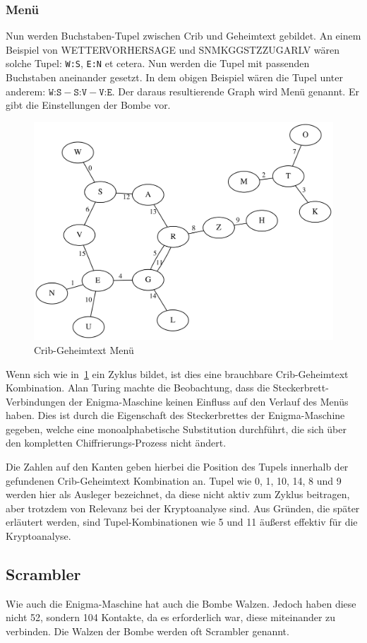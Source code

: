 \subsubsection{Menü}\label{subsubsec:menu}
Nun werden Buchstaben-Tupel zwischen Crib und Geheimtext gebildet.
An einem Beispiel von \glqq WETTERVORHERSAGE\grqq{} und \glqq SNMKGGSTZZUGARLV\grqq{} wären solche Tupel: \texttt{W:S}, \texttt{E:N} et cetera.
Nun werden die Tupel mit passenden Buchstaben aneinander gesetzt. 
In dem obigen Beispiel wären die Tupel unter anderem: $\texttt{W:S} - \texttt{S:V} - \texttt{V:E}$.
Der daraus resultierende Graph wird \glqq Menü\grqq{} genannt.
Er gibt die Einstellungen der Bombe vor.
\nopagebreak
\begin{figure}[htbp]
	\centering
	\includegraphics[width=.6\linewidth]{Turing Bomb/crib_cipher_cycle}
	\caption{Crib-Geheimtext Menü}
	\label{fig:crib_cipher_cycle}
\end{figure}

Wenn sich wie in~\cref{fig:crib_cipher_cycle} ein Zyklus bildet, ist dies eine brauchbare Crib-Geheimtext Kombination.
Alan Turing machte die Beobachtung, dass die Steckerbrett-Verbindungen der Enigma-Maschine keinen Einfluss auf den Verlauf des Menüs haben.
Dies ist durch die Eigenschaft des Steckerbrettes der Enigma-Maschine gegeben, welche eine monoalphabetische Substitution durchführt, die sich über den kompletten Chiffrierungs-Prozess nicht ändert.

Die Zahlen auf den Kanten geben hierbei die Position des Tupels innerhalb der gefundenen Crib-Geheimtext Kombination an.
Tupel wie 0, 1, 10, 14, 8 und 9 werden hier als \glqq Ausleger\grqq{} bezeichnet, da diese nicht aktiv zum Zyklus beitragen, aber trotzdem von Relevanz bei der Kryptoanalyse sind.
Aus Gründen, die später erläutert werden, sind Tupel-Kombinationen wie 5 und 11 äußerst effektiv für die Kryptoanalyse.


\newpage

\subsection{Scrambler}\label{subsec:scrambler}
Wie auch die Enigma-Maschine hat auch die Bombe \glqq Walzen\grqq.
Jedoch haben diese nicht 52, sondern 104 Kontakte, da es erforderlich war, diese miteinander zu verbinden.
Die Walzen der Bombe werden oft Scrambler genannt.

